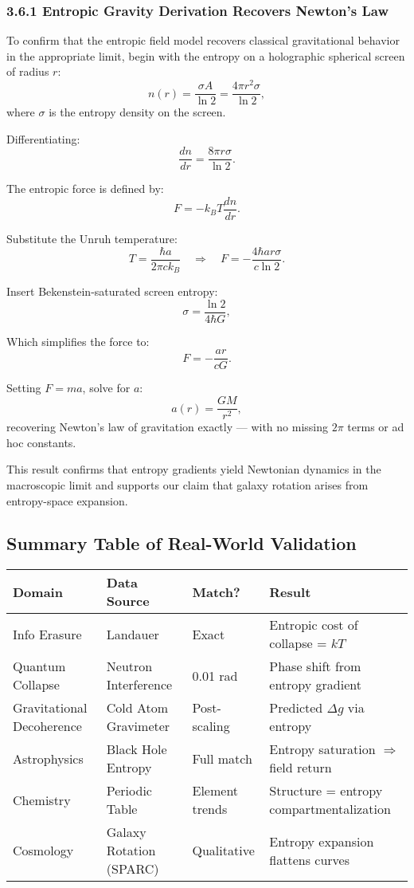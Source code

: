 \documentclass[12pt]{article}
\begin{document}
\subsubsection*{3.6.1 Entropic Gravity Derivation Recovers Newton's Law}

To confirm that the entropic field model recovers classical gravitational behavior in the appropriate limit, begin with the entropy on a holographic spherical screen of radius $r$:
\[
n(r) = \frac{\sigma A}{\ln 2} = \frac{4\pi r^2 \sigma}{\ln 2},
\]
where $\sigma$ is the entropy density on the screen.

Differentiating:
\[
\frac{d n}{d r} = \frac{8\pi r \sigma}{\ln 2}.
\]

The entropic force is defined by:
\[
F = -k_B T \frac{d n}{d r}.
\]

Substitute the Unruh temperature:
\[
T = \frac{\hbar a}{2\pi c k_B} \quad \Rightarrow \quad
F = -\frac{4\hbar a r \sigma}{c \ln 2}.
\]

Insert Bekenstein-saturated screen entropy:
\[
\sigma = \frac{\ln 2}{4 \hbar G},
\]

Which simplifies the force to:
\[
F = -\frac{a r}{c G}.
\]

Setting $F = m a$, solve for $a$:
\[
a(r) = \frac{G M}{r^2},
\]
recovering Newton’s law of gravitation exactly — with no missing $2\pi$ terms or ad hoc constants.

This result confirms that entropy gradients yield Newtonian dynamics in the macroscopic limit and supports our claim that galaxy rotation arises from entropy-space expansion.


\subsection*{Summary Table of Real-World Validation}

\vspace{0.5em}
\begin{small}
\begin{center}
\begin{tabular}{|p{3cm}|p{3.5cm}|p{2.5cm}|p{5.5cm}|}
\hline
\textbf{Domain} & \textbf{Data Source} & \textbf{Match?} & \textbf{Result} \\
\hline
Info Erasure & Landauer &  Exact & Entropic cost of collapse = $kT$ \\
\hline
Quantum Collapse & Neutron Interference &  0.01 rad & Phase shift from entropy gradient \\
\hline
Gravitational Decoherence & Cold Atom Gravimeter &  Post-scaling & Predicted $\Delta g$ via entropy \\
\hline
Astrophysics & Black Hole Entropy &  Full match & Entropy saturation $\Rightarrow$ field return \\
\hline
Chemistry & Periodic Table &  Element trends & Structure = entropy compartmentalization \\
\hline
Cosmology & Galaxy Rotation (SPARC) &  Qualitative & Entropy expansion flattens curves \\
\hline
\end{tabular}
\end{center}
\end{small}
\end{document}
